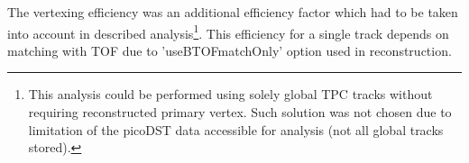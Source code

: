 The vertexing efficiency was an additional efficiency factor which had to be taken into account in described analysis\footnote{This analysis could be performed using solely global TPC tracks without requiring reconstructed primary vertex. Such solution was not chosen due to limitation of the picoDST data accessible for analysis (not all global tracks stored).}. This efficiency for a single track depends on matching with TOF due to 'useBTOFmatchOnly' option used in reconstruction. %
%
\begin{figure}[b!]
\centering
\parbox{0.4725\textwidth}{
  \centering
  \begin{subfigure}[b]{\linewidth}
                \vspace{-5pt}
  \end{subfigure}
}%
\quad\quad%
\parbox{0.4725\textwidth}{
  \centering
  \begin{subfigure}[b]{\linewidth}
                \vspace{-5pt}

\end{subfigure}}
\end{figure}
